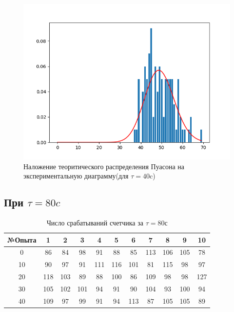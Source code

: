 \documentclass[a4paper, 12pt]{article}
\begin{document}
\begin{figure}[h!]
    \centering
    \includegraphics[width=1\textwidth]{40.png}
    \caption{Наложение теоритического распределения Пуасона на экспериментальную диаграмму(для $\tau = 40$c)}
    \label{fig:my_label}
\end{figure}

\clearpage

\subsection*{При $\tau=80 c$}

\begin{table}[!h]
\begin{center}
\begin{tabular}{|c|c|c|c|c|c|c|c|c|c|c|}
\hline
№Опыта & 1 & 2 & 3 & 4 & 5 & 6 & 7 & 8 & 9 & 10 \\ \hline
0 & 86  & 84  & 98  & 91  & 88  & 85  & 113 & 106 & 105 & 78  \\ \hline
10 & 90  & 97  & 91  & 111 & 116 & 101 & 81  & 115 & 98  & 97  \\ \hline
20 & 118 & 103 & 89  & 88  & 100 & 86  & 109 & 98  & 98  & 127 \\ \hline
30 & 105 & 102 & 101 & 94  & 91  & 90  & 104 & 93  & 100 & 94  \\ \hline
40 & 109 & 97  & 99  & 91  & 94  & 113 & 87  & 105 & 105 & 89 \\ \hline
\end{tabular}
\caption*{Число срабатываний счетчика за $\tau = 80$с}
\end{center}
\end{table}
\end{document}
